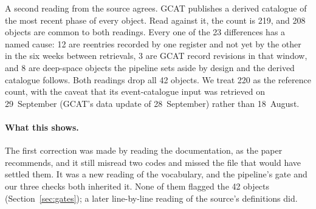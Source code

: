 A second reading from the source agrees. GCAT publishes a derived catalogue of
the most recent phase of every object. Read against it, the count is 219, and 208
objects are common to both readings. Every one of the 23 differences has a named
cause: 12 are reentries recorded by one register and not yet by the other in the
six weeks between retrievals, 3 are GCAT record revisions in that window, and 8
are deep-space objects the pipeline sets aside by design and the derived
catalogue follows. Both readings drop all 42 objects. We treat 220 as the
reference count, with the caveat that its event-catalogue input was retrieved on
29~September (GCAT's data update of 28~September) rather than 18~August.

\paragraph{What this shows.}
The first correction was made by reading the documentation, as the paper
recommends, and it still misread two codes and missed the file that would have
settled them. It was a new reading of the vocabulary, and the pipeline's gate
and our three checks both inherited it. None of them
flagged the 42 objects (Section~\ref{sec:gates}); a later line-by-line reading
of the source's definitions did.
